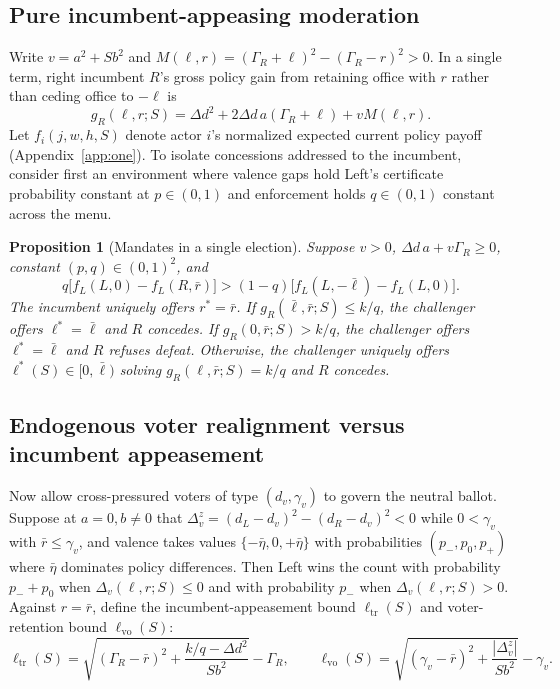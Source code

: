\documentclass[11pt,letterpaper]{article}
\newtheorem{proposition}{Proposition}
\newcommand{\Dd}{\Delta d}
\begin{document}
\subsection{Pure incumbent-appeasing moderation}

Write $v=a^2+Sb^2$ and $M(\ell,r)=(\Gamma_R+\ell)^2-(\Gamma_R-r)^2>0$. In a single term, right incumbent $R$'s gross policy gain from retaining office with $r$ rather than ceding office to $-\ell$ is
\begin{equation}
 g_R(\ell,r;S)=\Dd^2+2\Dd\,a(\Gamma_R+\ell)+v M(\ell,r).
 \label{eq:g-symbolic}
\end{equation}
Let $f_i(j,w,h,S)$ denote actor $i$'s normalized expected current policy payoff (Appendix~\ref{app:one}). To isolate concessions addressed to the incumbent, consider first an environment where valence gaps hold Left's certificate probability constant at $p\in(0,1)$ and enforcement holds $q\in(0,1)$ constant across the menu.

\begin{proposition}[Mandates in a single election]\label{prop:onegen}
Suppose $v>0$, $\Dd\,a+v\Gamma_R\ge 0$, constant $(p,q)\in(0,1)^2$, and
\begin{equation}
 q\big[f_L(L,0)-f_L(R,\bar r)\big]>
 (1-q)\big[f_L(L,-\bar\ell)-f_L(L,0)\big] .
 \label{eq:leftone}
\end{equation}
The incumbent uniquely offers $r^*=\bar r$. If $g_R(\bar\ell,\bar r;S)\le k/q$, the challenger offers $\ell^*=\bar\ell$ and $R$ concedes. If $g_R(0,\bar r;S)>k/q$, the challenger offers $\ell^*=\bar\ell$ and $R$ refuses defeat. Otherwise, the challenger uniquely offers $\ell^*(S)\in[0,\bar\ell)$ solving $g_R(\ell,\bar r;S)=k/q$ and $R$ concedes.
\end{proposition}

\subsection{Endogenous voter realignment versus incumbent appeasement}\label{sec:realign-campaign}

Now allow cross-pressured voters of type $(d_v,\gamma_v)$ to govern the neutral ballot. Suppose at $a=0,b\ne 0$ that $\Delta_v^z=(d_L-d_v)^2-(d_R-d_v)^2<0$ while $0<\gamma_v$ with $\bar r\le\gamma_v$, and valence takes values $\{-\bar\eta,0,+\bar\eta\}$ with probabilities $(p_-,p_0,p_+)$ where $\bar\eta$ dominates policy differences. Then Left wins the count with probability $p_-+p_0$ when $\Delta_v(\ell,r;S)\le 0$ and with probability $p_-$ when $\Delta_v(\ell,r;S)>0$. Against $r=\bar r$, define the incumbent-appeasement bound $\ell_{\mathrm{tr}}(S)$ and voter-retention bound $\ell_{\mathrm{vo}}(S)$:
\[
 \ell_{\mathrm{tr}}(S)=\sqrt{(\Gamma_R-\bar r)^2+\frac{k/q-\Dd^2}{Sb^2}}-\Gamma_R,\qquad
 \ell_{\mathrm{vo}}(S)=\sqrt{(\gamma_v-\bar r)^2+\frac{|\Delta_v^z|}{Sb^2}}-\gamma_v.
\]
\end{document}
